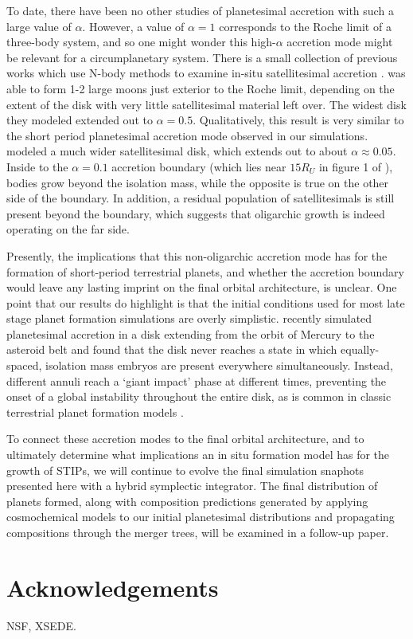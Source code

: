 \documentclass[twocolumn]{aastex63}
\begin{document}
To date, there have been no other studies of planetesimal accretion
with such a large value of $\alpha$. However, a value of $\alpha = 1$
corresponds to the Roche limit of a three-body system, and so one
might wonder this high-$\alpha$ accretion mode might be relevant for a
circumplanetary system. There is a small collection of previous works
which use N-body methods to examine in-situ satellitesimal accretion
\citep{ida97, richardson00, ida20}. \citet{ida97} was able to form 1-2
large moons just exterior to the Roche limit, depending on the extent of the disk with very little satellitesimal material left over. The widest disk they modeled extended out to $\alpha = 0.5$. Qualitatively, this result is very similar to the short period planetesimal accretion mode observed in our simulations. \citet{ida20} modeled a much wider satellitesimal disk, which extends out to about $\alpha \approx 0.05$. Inside to the $\alpha = 0.1$ accretion boundary (which lies near $15 R_{U}$ in figure 1 of \citet{ida20}), bodies grow beyond the isolation mass, while the opposite is true on the other side of the boundary. In addition, a residual population of satellitesimals is still present beyond the boundary, which suggests that oligarchic growth is indeed operating on the far side.

Presently, the implications that this non-oligarchic accretion mode has for the formation of short-period terrestrial planets, and whether the accretion boundary would leave any lasting imprint on the final orbital architecture, is unclear. One point that our results do highlight is that the initial conditions used for most late stage planet formation simulations are overly simplistic. \citet{clement20} recently simulated planetesimal accretion in a disk extending from the orbit of Mercury to the asteroid belt and found that the disk never reaches a state in which equally-spaced, isolation mass embryos are present everywhere simultaneously. Instead, different annuli reach a `giant impact' phase at different times, preventing the onset of a global instability throughout the entire disk, as is common in classic terrestrial planet formation models \citep{chambers01, raymond09}.


To connect these accretion modes to the final orbital architecture,
and to ultimately determine what implications an in situ formation model has for the growth of STIPs, we will continue to evolve the final simulation snaphots presented here with a hybrid symplectic integrator. The final distribution of planets formed, along with composition predictions generated by applying cosmochemical models to our initial planetesimal distributions and propagating compositions through the merger trees, will be examined in a follow-up paper.

\section{Acknowledgements}

NSF, XSEDE.



\clearpage
\end{document}

